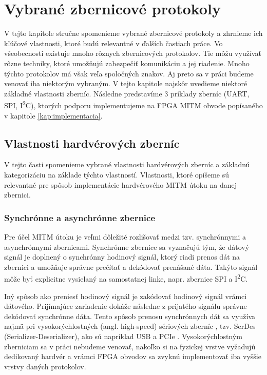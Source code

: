 \chapter{Vybrané zbernicové protokoly}
\label{kap:zbernice}

V tejto kapitole stručne spomenieme vybrané zbernicové protokoly a zhrnieme ich kľúčové vlastnosti, ktoré budú relevantné v ďalších častiach práce. Vo všeobecnosti existuje mnoho rôznych zbernicových protokolov. Tie môžu využívať rôzne techniky, ktoré umožňujú zabezpečiť komunikáciu a jej riadenie. Mnoho týchto protokolov má však veľa spoločných znakov. Aj preto sa v práci budeme venovať iba niektorým vybraným. V tejto kapitole najskôr uvedieme niektoré základné vlastnosti zberníc. Následne predstavíme 3 príklady zberníc (UART, SPI, I\textsuperscript{2}C), ktorých podporu implementujeme na FPGA MITM obvode popísaného v kapitole \ref{kap:implementacia}.

\section{Vlastnosti hardvérových zberníc}
V tejto časti spomenieme vybrané vlastnosti hardvérových zberníc a základnú kategorizáciu na základe týchto vlastností. Vlastnosti, ktoré opíšeme sú relevantné pre spôsob implementácie hardvérového MITM útoku na danej zbernici.

\subsection{Synchrónne a asynchrónne zbernice}
Pre účel MITM útoku je veľmi dôležité rozlišovať medzi tzv. synchrónnymi a asynchrónnymi zbernicami. Synchrónne zbernice sa vyznačujú tým, že dátový signál je doplnený o synchrónny hodinový signál, ktorý riadi prenos dát na zbernici a umožňuje správne prečítať a dekódovať prenášané dáta. Takýto signál môže byť explicitne vysielaný na samostatnej linke, napr. zbernice SPI a I\textsuperscript{2}C.

Iný spôsob ako preniesť hodinový signál je zakódovať hodinový signál vrámci dátového. Prijímajúce zariadenie dokáže následne z prijatého signálu správne dekódovať synchrónne dáta. Tento spôsob prenosu synchrónnych dát sa využíva najmä pri vysokorýchlostných (angl. high-speed) sériových zberníc \cite{serdes}, tzv. SerDes (Serializer-Deserializer), ako sú napríklad USB a PCIe \cite{pcieSpec}. Vysokorýchlostným zberniciam sa v práci nebudeme venovať, nakoľko si na fyzickej vrstve vyžadujú dedikovaný hardvér a vrámci FPGA obvodov sa zvyknú implementovať iba vyššie vrstvy daných protokolov.

